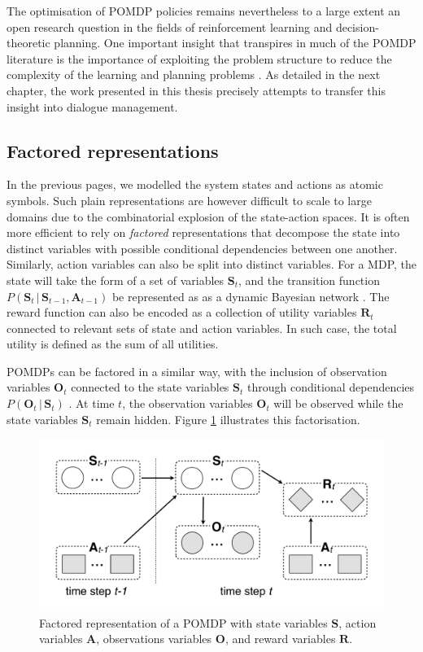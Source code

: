 The optimisation of POMDP policies remains nevertheless to a large extent an open research question in the fields of reinforcement learning and decision-theoretic planning. One important insight that transpires in much of the POMDP literature is the importance of exploiting the problem structure to reduce the complexity of the learning and planning problems \citep{Pineau:2004,poupart2005}.  As detailed in the next chapter, the work presented in this thesis precisely attempts to transfer this insight into dialogue management. 

\subsection{Factored representations}
\label{sec:factored}

In the previous pages, we modelled the system states and actions as atomic symbols.  Such plain representations are however difficult to scale to large domains due to the combinatorial explosion of the state-action spaces. It is often more efficient to rely on \textit{factored} representations that decompose the state into distinct variables with possible conditional dependencies between one another.  Similarly, action variables can also be split into distinct variables.  For a MDP, the state will take the form of a set of variables $\mathbf{S}_t$, and the transition function $P(\mathbf{S}_t \, | \, \mathbf{S}_{t-1},\mathbf{A}_{t-1})$ be represented as as a dynamic Bayesian network \citep{boutilier1999}. The reward function can also be encoded as a collection of utility variables $\mathbf{R}_t$ connected to relevant sets of state and action variables. In such case, the total utility is defined as the sum of all utilities.

POMDPs can be factored in a similar way, with the inclusion of observation variables $\mathbf{O}_t$ connected to the state variables $\mathbf{S}_t$ through conditional dependencies $P(\mathbf{O}_t \, | \, \mathbf{S}_t)$ \citep{poupart2005}.  At time $t$, the observation variables $\mathbf{O}_t$ will be observed while the state variables  $\mathbf{S}_t$ remain hidden. Figure \ref{fig:pomdp3} illustrates this factorisation. 

\begin{figure}[h]
\centering
\includegraphics[scale=0.25]{imgs/pomdp3.pdf}
\caption{Factored representation of a POMDP with state variables $\mathbf{S}$, action variables $\mathbf{A}$, observations variables $\mathbf{O}$, and reward variables $\mathbf{R}$. }
\label{fig:pomdp3}
\end{figure}


